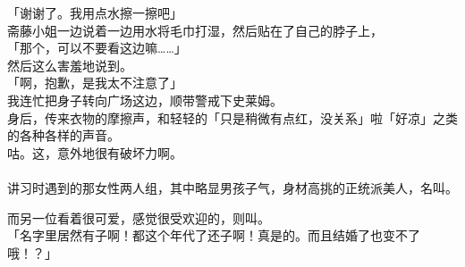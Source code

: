 「谢谢了。我用点水擦一擦吧」\\

斋藤小姐一边说着一边用水将毛巾打湿，然后贴在了自己的脖子上，\\

「那个，可以不要看这边嘛……」\\

然后这么害羞地说到。\\

「啊，抱歉，是我太不注意了」\\

我连忙把身子转向广场这边，顺带警戒下史莱姆。\\

身后，传来衣物的摩擦声，和轻轻的「只是稍微有点红，没关系」啦「好凉」之类的各种各样的声音。\\

咕。这，意外地很有破坏力啊。\\

\sqsplit\\

讲习时遇到的那女性两人组，其中略显男孩子气，身材高挑的正统派美人，名叫。

而另一位看着很可爱，感觉很受欢迎的，则叫。\\

「名字里居然有子啊！都这个年代了还子啊！真是的。而且结婚了也变不了哦！？」\\

